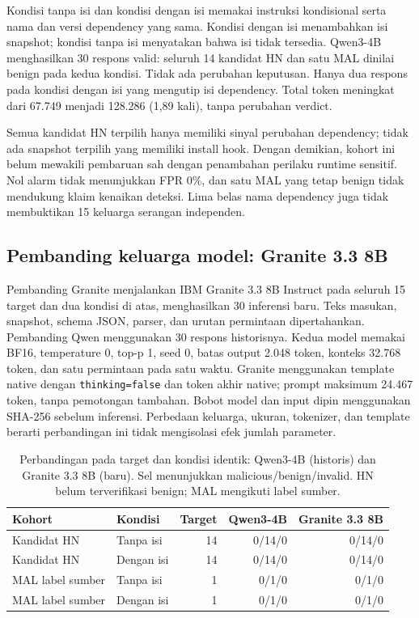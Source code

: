 Kondisi tanpa isi dan kondisi dengan isi memakai instruksi kondisional serta
nama dan versi dependency yang sama. Kondisi dengan isi menambahkan isi
snapshot; kondisi tanpa isi menyatakan bahwa isi tidak tersedia. Qwen3-4B
menghasilkan 30 respons valid: seluruh 14 kandidat HN dan satu MAL dinilai
benign pada kedua kondisi. Tidak ada perubahan keputusan. Hanya dua respons
pada kondisi dengan isi yang mengutip isi dependency. Total token meningkat
dari 67.749 menjadi 128.286 (1,89 kali), tanpa perubahan verdict.

Semua kandidat HN terpilih hanya memiliki sinyal perubahan dependency;
tidak ada snapshot terpilih yang memiliki install hook. Dengan demikian,
kohort ini belum mewakili pembaruan sah dengan penambahan perilaku runtime
sensitif. Nol alarm tidak menunjukkan FPR 0\%, dan satu MAL yang tetap
benign tidak mendukung klaim kenaikan deteksi. Lima belas nama dependency
juga tidak membuktikan 15 keluarga serangan independen.

\subsection{Pembanding keluarga model: Granite 3.3 8B}
\label{sec:granite-comparison}

Pembanding Granite menjalankan IBM Granite 3.3 8B Instruct pada seluruh 15
target dan dua kondisi di atas, menghasilkan 30 inferensi baru. Teks masukan,
snapshot, schema JSON, parser, dan urutan permintaan dipertahankan.
Pembanding Qwen menggunakan 30 respons historisnya. Kedua model memakai
BF16, temperature 0, top-p 1, seed 0, batas output 2.048 token, konteks
32.768 token, dan satu permintaan pada satu waktu. Granite menggunakan
template native dengan \texttt{thinking=false} dan token akhir native;
prompt maksimum 24.467 token, tanpa pemotongan tambahan. Bobot model dan
input dipin menggunakan SHA-256 sebelum inferensi. Perbedaan keluarga,
ukuran, tokenizer, dan template berarti perbandingan ini tidak mengisolasi
efek jumlah parameter.

\begin{table}[t]
\caption{Perbandingan pada target dan kondisi identik: Qwen3-4B (historis)
dan Granite 3.3 8B (baru). Sel menunjukkan malicious/benign/invalid.
HN belum terverifikasi benign; MAL mengikuti label sumber.}
\label{tab:granite-comparison}
\centering
\begin{tabular}{llrrr}
\toprule
Kohort & Kondisi & Target & Qwen3-4B & Granite 3.3 8B \\
\midrule
Kandidat HN & Tanpa isi & 14 & 0/14/0 & 0/14/0 \\
Kandidat HN & Dengan isi & 14 & 0/14/0 & 0/14/0 \\
MAL label sumber & Tanpa isi & 1 & 0/1/0 & 0/1/0 \\
MAL label sumber & Dengan isi & 1 & 0/1/0 & 0/1/0 \\
\bottomrule
\end{tabular}
\end{table}

